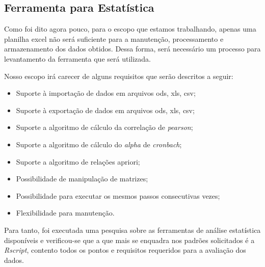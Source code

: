 \subsection{Ferramenta para Estatística}
\label{sub:ferramenta_para_estat_stica}
Como foi dito agora pouco, para o escopo que estamos trabalhando, apenas uma planilha excel não será suficiente
para a manutenção, processamento e armazenamento dos dados obtidos. Dessa forma, será  necessário um processo
para levantamento da ferramenta que será utilizada.

Nosso escopo irá carecer de alguns requisitos que serão descritos a seguir:

\begin{itemize}
    \item Suporte à importação de dados em arquivos ods, xls, csv;
    \item Suporte à exportação de dados em arquivos ods, xls, csv;
    \item Suporte a algoritmo de cálculo da correlação de \textit{pearson};
    \item Suporte a algoritmo de cálculo do \textit{alpha} de \textit{cronbach};
    \item Suporte a algoritmo de relações apriori;
    \item Possibilidade de manipulação de matrizes;
    \item Possibilidade para executar os mesmos passos consecutivas vezes;
    \item Flexibilidade para manutenção.
\end{itemize}

Para tanto, foi executada uma pesquisa sobre as ferramentas de análise estatística
disponíveis e verificou-se que a que mais se enquadra nos padrões solicitados
é a \textit{Rscript}, contento todos os pontos e requisitos requeridos para a
avaliação dos dados.

